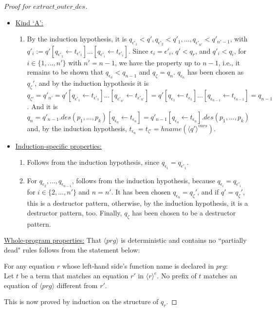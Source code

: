 \documentclass[11pt]{article} %
\begin{document}
\begin{proof}[Proof for $extract\_outer\_des$]
\begin{itemize}
\begin{itemize}
\item \underline{Kind `A':}
\begin{enumerate}
\item By the induction hypothesis, it is $q_{\epsilon'_1} < q', q_{\epsilon'_2} < q'_1, ..., q_{\epsilon'_{n'}} < q'_{n'-1}$, with $q'_i := q'[q_{\epsilon'_1} \leftarrow t_{\epsilon'_1}]...[q_{\epsilon'_i} \leftarrow t_{\epsilon'_i}]$. Since $\epsilon_i = \epsilon'_i$, $q' < q_r$, and $q'_i < q_i$, for $i \in \{1, ..., n'\}$ with $n' = n-1$, we have the property up to $n-1$, i.e., it remains to be shown that $q_{\epsilon_n} < q_{n-1}$ and $q_\zeta = q_n$. $q_{\epsilon_n}$ has been chosen as $q_\zeta'$, and by the induction hypothesis it is $q_{\zeta'} = q'_{n'} = q'[q_{\epsilon'_1} \leftarrow t_{\epsilon'_1}]...[q_{\epsilon'_{n'}} \leftarrow t_{\epsilon'_{n'}}] = q'[q_{\epsilon_1} \leftarrow t_{\epsilon_1}]...[q_{\epsilon_{n-1}} \leftarrow t_{\epsilon_{n-1}}] = q_{n-1}$. And it is $q_n = q'_{n-1}.des(p_1, ..., p_k)[q_{\epsilon_n} \leftarrow t_{\epsilon_n}] = q'_{n-1}[q_{\epsilon_n} \leftarrow t_{\epsilon_n}].des(p_1, ..., p_k)$ and, by the induction hypothesis, $t_{\epsilon_n} = t_{\zeta'} = hname(\langle q' \rangle^{vars})$.
\end{enumerate}

\item \underline{Induction-specific properties:}
\begin{enumerate}
\item Follows from the induction hypothesis, since $q_{\epsilon_1} = q_{\epsilon'_1}$.
\item For $q_{\epsilon_2}, ..., q_{\epsilon_{n-1}}$, follows from the induction hypothesis, because $q_{\epsilon_i} = q_{\epsilon'_i}$ for $i \in \{2, ..., n'\}$ and $n = n'$. It has been chosen $q_{\epsilon_n} = q_\zeta'$, and if $q' = q_\zeta'$, this is a destructor pattern, otherwise, by the induction hypothesis, it is a destructor pattern, too. Finally, $q_\zeta$ has been chosen to be a destructor pattern.
\end{enumerate}

\end{itemize}

\end{itemize}

\underline{Whole-program properties:} That $\langle prg \rangle$ is deterministic and contains no ``partially dead" rules follows from the statement below:
\begin{center}
For any equation $r$ whose left-hand side's function name is declared in $prg$:\\
Let $t$ be a term that matches an equation $r'$ in $\langle r \rangle^e$. No prefix of $t$ matches an equation of $\langle prg \rangle$ different from $r'$.
\end{center}
This is now proved by induction on the structure of $q_r$.


\end{proof}
\end{document}

